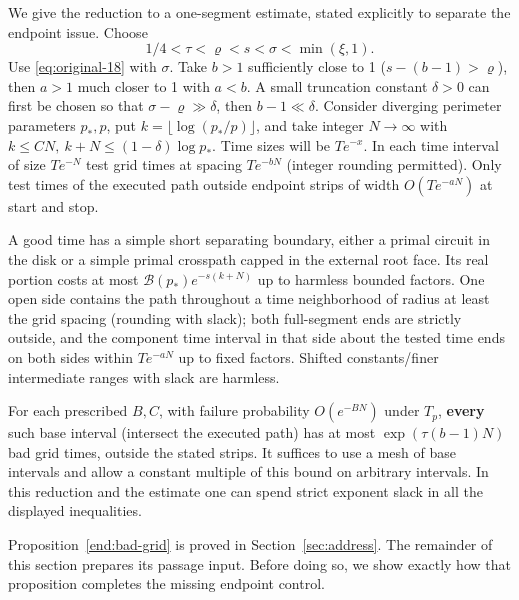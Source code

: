 We give the reduction to a one-segment estimate, stated explicitly to separate the
endpoint issue. Choose \[
 1/4<\tau<\varrho<s<\sigma<\min(\xi,1).
\] Use \eqref{eq:original-18} with \(\sigma\). Take \(b>1\) sufficiently close to 1
(\(s-(b-1)>\varrho\)), then \(a>1\) much closer to 1 with \(a<b\). A small truncation
constant \(\delta>0\) can first be chosen so that \(\sigma-\varrho\gg\delta\), then
\(b-1\ll\delta\). Consider diverging perimeter parameters \(p_*,p\), put
\(k=\lfloor\log(p_*/p)\rfloor\), and take integer \(N\to\infty\) with \(k\le C N,\ k+N\le(1-\delta)\log p_*\). Time sizes will be
\(T e^{-x}\). In each time interval of size \(T e^{-N}\) test grid times at spacing
\(T e^{-bN}\) (integer rounding permitted). Only test times of the executed path outside
endpoint strips of width \(O(T e^{-aN})\) at start and stop.

\begin{definition}\label{end:good-time}

A good time has a simple short separating boundary, either a primal circuit in the
disk or a simple primal crosspath capped in the external root face. Its real portion costs
at most \(\mathcal B(p_*) e^{-s(k+N)}\) up to harmless bounded factors. One open side
contains the path throughout a time neighborhood of radius at least the grid spacing
(rounding with slack); both full-segment ends are strictly outside, and the component time
interval in that side about the tested time ends on both sides within \(T e^{-aN}\) up to
fixed factors. Shifted constants/finer intermediate ranges with slack are harmless.

\end{definition}

\begin{proposition}\label{end:bad-grid}

For each prescribed \(B,C\), with failure probability \(O(e^{-B N})\) under \(T_p\),
\textbf{every} such base interval (intersect the executed path) has at most
\(\exp(\tau(b-1)N)\) bad grid times, outside the stated strips. It suffices to use a mesh
of base intervals and allow a constant multiple of this bound on arbitrary intervals. In
this reduction and the estimate one can spend strict exponent slack in all the displayed
inequalities.

\end{proposition}

Proposition~\ref{end:bad-grid} is proved in Section~\ref{sec:address}. The
remainder of this section prepares its passage input. Before doing so, we show
exactly how that proposition completes the missing endpoint control.

